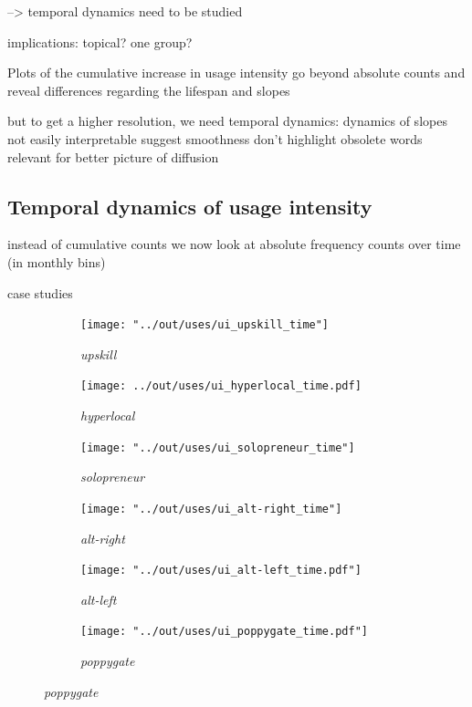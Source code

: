 \documentclass[
  a4paper,
  abstract=on,
  captions=tableabove
  ]{scrartcl}
\begin{document}
  --> temporal dynamics need to be studied

  implications: topical? one group?


  Plots of the cumulative increase in usage intensity
    go beyond absolute counts
    and reveal differences
      regarding the lifespan
      and slopes

  but to get a higher resolution, we need
    temporal dynamics:
    dynamics of slopes not easily interpretable
      suggest smoothness
      don't highlight obsolete words
    relevant for better picture of diffusion







    \subsection{Temporal dynamics of usage intensity}

  instead of cumulative counts we now look at absolute frequency counts over time (in monthly bins)

  case studies

  \begin{figure}
    \caption{Temporal dynamics in usage frequency for case studies.}
    \centering
    \begin{subfigure}{.3\linewidth}
      \caption{\emph{upskill}}
      \texttt{[image: "../out/uses/ui\_upskill\_time"]}
    \end{subfigure}
    \begin{subfigure}{.3\linewidth}
      \caption{\emph{hyperlocal}}
      \texttt{[image: ../out/uses/ui\_hyperlocal\_time.pdf]}
    \end{subfigure}
    \begin{subfigure}{.3\linewidth}
      \caption{\emph{solopreneur}}
      \texttt{[image: "../out/uses/ui\_solopreneur\_time"]}
    \end{subfigure}

    \begin{subfigure}{.3\linewidth}
      \caption{\emph{alt-right}}
      \label{subfig:freq_temp_alt-right}
      \texttt{[image: "../out/uses/ui\_alt-right\_time"]}
    \end{subfigure}
    \begin{subfigure}{.3\linewidth}
      \caption{\emph{alt-left}}
      \texttt{[image: "../out/uses/ui\_alt-left\_time.pdf"]}
    \end{subfigure}
    \begin{subfigure}{.3\linewidth}
      \caption{\emph{poppygate}}
      \texttt{[image: "../out/uses/ui\_poppygate\_time.pdf"]}
    \end{subfigure}
  \end{figure}
\end{document}

